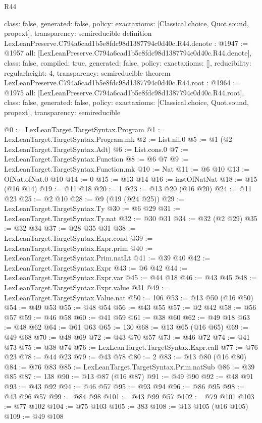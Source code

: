 \begin{lexlean}{R44}
\begin{coremodule}
{  class: false,
  generated: false,
  policy: exact{axioms: [Classical.choice, Quot.sound, propext]},
  transparency: semireducible
}
definition LexLeanPreserve.C794a6cad1b5e8fdc98d1387794c0d40c.R44.denote : @1947 := @1957 {
  all: [LexLeanPreserve.C794a6cad1b5e8fdc98d1387794c0d40c.R44.denote],
  class: false,
  compiled: true,
  generated: false,
  policy: exact{axioms: []},
  reducibility: regular{height: 4},
  transparency: semireducible
}
theorem LexLeanPreserve.C794a6cad1b5e8fdc98d1387794c0d40c.R44.root : @1964 := @1975 {
  all: [LexLeanPreserve.C794a6cad1b5e8fdc98d1387794c0d40c.R44.root],
  class: false,
  generated: false,
  policy: exact{axioms: [Classical.choice, Quot.sound, propext]},
  transparency: semireducible
}

@0 := LexLeanTarget.TargetSyntax.Program
@1 := LexLeanTarget.TargetSyntax.Program.mk
@2 := List.nil.{0}
@5 := @1 (@2 LexLeanTarget.TargetSyntax.Adt)
@6 := List.cons.{0}
@7 := LexLeanTarget.TargetSyntax.Function
@8 := @6 @7
@9 := LexLeanTarget.TargetSyntax.Function.mk
@10 := Nat
@11 := @6 @10
@13 := OfNat.ofNat.{0} @10
@14 := 0
@15 := @13 @14
@16 := instOfNatNat
@18 := @15 (@16 @14)
@19 := @11 @18
@20 := 1
@23 := @13 @20 (@16 @20)
@24 := @11 @23
@25 := @2 @10
@28 := @9 (@19 (@24 @25))
@29 := LexLeanTarget.TargetSyntax.Ty
@30 := @6 @29
@31 := LexLeanTarget.TargetSyntax.Ty.nat
@32 := @30 @31
@34 := @32 (@2 @29)
@35 := @32 @34
@37 := @28 @35 @31
@38 := LexLeanTarget.TargetSyntax.Expr.cond
@39 := LexLeanTarget.TargetSyntax.Expr.prim
@40 := LexLeanTarget.TargetSyntax.Prim.natLt
@41 := @39 @40
@42 := LexLeanTarget.TargetSyntax.Expr
@43 := @6 @42
@44 := LexLeanTarget.TargetSyntax.Expr.var
@45 := @44 @18
@46 := @43 @45
@48 := LexLeanTarget.TargetSyntax.Expr.value @31
@49 := LexLeanTarget.TargetSyntax.Value.nat
@50 := 106
@53 := @13 @50 (@16 @50)
@54 := @49 @53
@55 := @48 @54
@56 := @43 @55
@57 := @2 @42
@58 := @56 @57
@59 := @46 @58
@60 := @41 @59
@61 := @38 @60
@62 := @49 @18
@63 := @48 @62
@64 := @61 @63
@65 := 130
@68 := @13 @65 (@16 @65)
@69 := @49 @68
@70 := @48 @69
@72 := @43 @70 @57
@73 := @46 @72
@74 := @41 @73
@75 := @38 @74
@76 := LexLeanTarget.TargetSyntax.Expr.call
@77 := @76 @23
@78 := @44 @23
@79 := @43 @78
@80 := 2
@83 := @13 @80 (@16 @80)
@84 := @76 @83
@85 := LexLeanTarget.TargetSyntax.Prim.natSub
@86 := @39 @85
@87 := 138
@90 := @13 @87 (@16 @87)
@91 := @49 @90
@92 := @48 @91
@93 := @43 @92
@94 := @46 @57
@95 := @93 @94
@96 := @86 @95
@98 := @43 @96 @57
@99 := @84 @98
@101 := @43 @99 @57
@102 := @79 @101
@103 := @77 @102
@104 := @75 @103
@105 := 383
@108 := @13 @105 (@16 @105)
@109 := @49 @108

\end{coremodule}
\end{lexlean}
